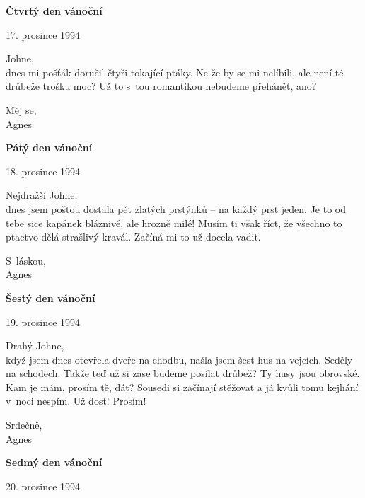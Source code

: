 \noindent
\textbf{Čtvrtý den vánoční}

\begin{flushright}
17. prosince 1994 
\end{flushright}

\noindent
Johne,\\
dnes mi pošťák doručil čtyři tokající ptáky. Ne že by se mi nelíbili, ale není té drůbeže trošku moc? Už to s tou romantikou nebudeme přehánět, ano? 

\medskip

\noindent
Měj se, \\
Agnes

\bigskip

\noindent
\textbf{Pátý den vánoční }

\begin{flushright}
18. prosince 1994 
\end{flushright}

\noindent
Nejdražší Johne,\\
dnes jsem poštou dostala pět zlatých prstýnků – na každý prst jeden. Je to od tebe sice kapánek bláznivé, ale hrozně milé! Musím ti však říct, že všechno to ptactvo dělá strašlivý kravál. Začíná mi to už docela vadit. 

\medskip

\noindent
S láskou,\\ 
Agnes 

\newpage

\noindent
\textbf{Šestý den vánoční}

\begin{flushright}
19. prosince 1994 
\end{flushright}

\noindent
Drahý Johne, \\
když jsem dnes otevřela dveře na chodbu, našla jsem šest hus na vejcích. Seděly na schodech. Takže teď už si zase budeme posílat drůbež? Ty husy jsou obrovské. Kam je mám, prosím tě, dát? Sousedi si začínají stěžovat a já kvůli tomu kejhání v noci nespím. Už dost! Prosím!
 
\medskip

\noindent
Srdečně, \\
Agnes

\bigskip

\noindent
\textbf{Sedmý den vánoční}

\begin{flushright}
20. prosince 1994 
\end{flushright}


